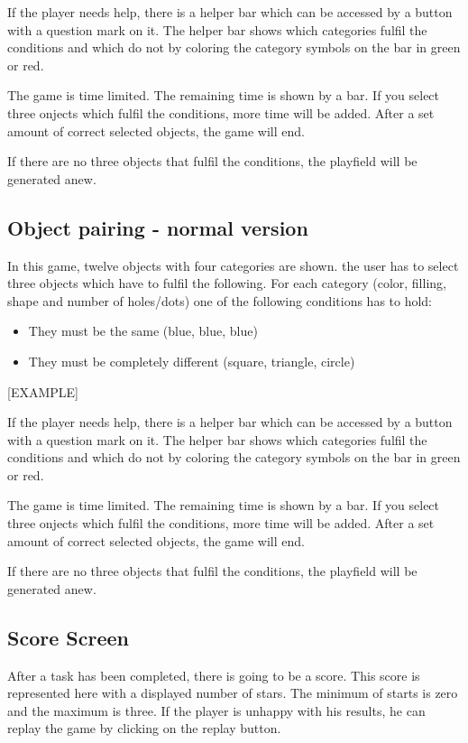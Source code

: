 If the player needs help, there is a helper bar which can be accessed by a button with a question mark on it.
The helper bar shows which categories fulfil the conditions and which do not
by coloring the category symbols on the bar in green or red.

The game is time limited. The remaining time is shown by a bar.
If you select three onjects which fulfil the conditions, more time will be added.
After a set amount of correct selected objects, the game will end.

If there are no three objects that fulfil the conditions, the playfield will be generated anew.

\subsection{Object pairing - normal version}
In this game, twelve objects with four categories are shown.
the user has to select three objects which have to fulfil the following.
For each category (color, filling, shape and number of holes/dots) one of the following conditions has to hold:
\begin{itemize}
    \item They must be the same (blue, blue, blue)
    \item They must be completely different (square, triangle, circle)
\end{itemize}
[EXAMPLE]

If the player needs help, there is a helper bar which can be accessed by a button with a question mark on it.
The helper bar shows which categories fulfil the conditions and which do not
by coloring the category symbols on the bar in green or red.

The game is time limited. The remaining time is shown by a bar.
If you select three onjects which fulfil the conditions, more time will be added.
After a set amount of correct selected objects, the game will end.

If there are no three objects that fulfil the conditions, the playfield will be generated anew.

\subsection{Score Screen}
After a task has been completed, there is going to be a score.
This score is represented here with a displayed number of stars.
The minimum of starts is zero and the maximum is three.
If the player is unhappy with his results, he can replay the game by clicking on the replay button.

